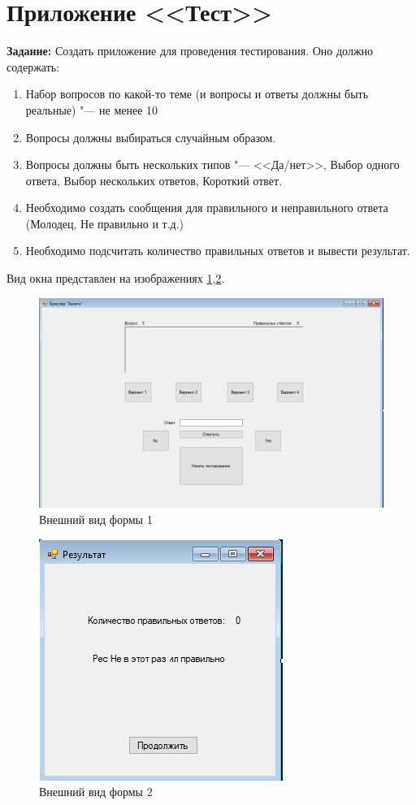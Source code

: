 \section{Приложение <<Тест>>}

\textbf{Задание:} Создать приложение для проведения тестирования. Оно должно содержать:

\begin{enumerate}
    \item Набор вопросов по какой-то теме (и вопросы и ответы должны быть реальные) "--- не менее 10
    \item Вопросы должны выбираться случайным образом.
    \item Вопросы должны быть нескольких типов "--- <<Да/нет>>, Выбор одного ответа, Выбор нескольких ответов, Короткий ответ.
    \item Необходимо создать сообщения для правильного и неправильного ответа (Молодец, Не правильно и т.д.)
    \item Необходимо подсчитать количество правильных ответов и вывести результат.
\end{enumerate}
Вид окна представлен на изображениях \ref{fig:task9_form1},\ref{fig:task9_form2}.
\begin{figure}[H]
    \centering
    \includegraphics[scale=0.6]{task9/form1.png}
    \caption{Внешний вид формы 1}
    \label{fig:task9_form1}
\end{figure}
\begin{figure}[H]
    \centering
    \includegraphics[scale=0.8]{task9/form2.png}
    \caption{Внешний вид формы 2}
    \label{fig:task9_form2}
\end{figure}
